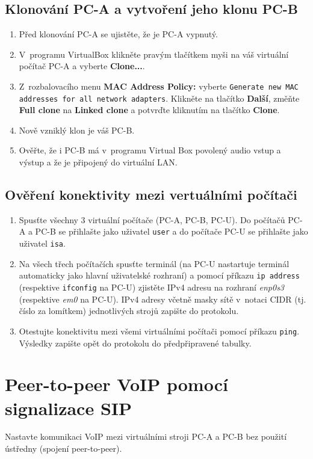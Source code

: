 \subsection{Klonování PC-A a vytvoření jeho klonu PC-B}
\begin{enumerate}
	\item Před klonování PC-A se ujistěte, že je PC-A vypnutý.
	\item V~programu VirtualBox klikněte pravým tlačítkem myši na váš virtuální počítač PC-A a vyberte \textbf{Clone...}.
	\item Z~rozbalovacího menu \textbf{MAC Address Policy:} vyberte \texttt{Generate new MAC addresses for all network adapters}. Klikněte na tlačítko \textbf{Další}, změňte \textbf{Full clone} na \textbf{Linked clone} a potvrďte kliknutím na tlačítko \textbf{Clone}.
	\item Nově vzniklý klon je váš PC-B.
	\item Ověřte, že i PC-B má v~programu Virtual Box povolený audio vstup a výstup a že je připojený do virtuální LAN.
\end{enumerate}


\subsection{Ověření konektivity mezi vertuálními počítači}
\begin{enumerate}
	\item Spusťte všechny 3 virtuální počítače (PC-A, PC-B, PC-U). Do počítačů PC-A a PC-B se přihlašte jako uživatel \texttt{user} a do počítače PC-U se přihlašte jako uživatel \texttt{isa}.
	\item Na všech třech počítačích spusťte terminál (na PC-U nastartuje terminál automaticky jako hlavní uživatelské rozhraní) a pomocí příkazu \verb{ip address{ (respektive \verb{ifconfig{ na PC-U) zjistěte IPv4 adresu na rozhraní \emph{enp0s3} (respektive \emph{em0} na PC-U). IPv4 adresy včetně masky sítě v~notaci CIDR (tj. číslo za lomítkem) jednotlivých strojů zapište do protokolu.
	\item Otestujte konektivitu mezi všemi virtuálními počítači pomocí příkazu \verb{ping{. Výsledky zapište opět do protokolu do předpřipravené tabulky.
\end{enumerate}


\section{Peer-to-peer VoIP pomocí signalizace SIP}
Nastavte komunikaci VoIP mezi virtuálními stroji PC-A a PC-B bez použití ústředny (spojení peer-to-peer).

